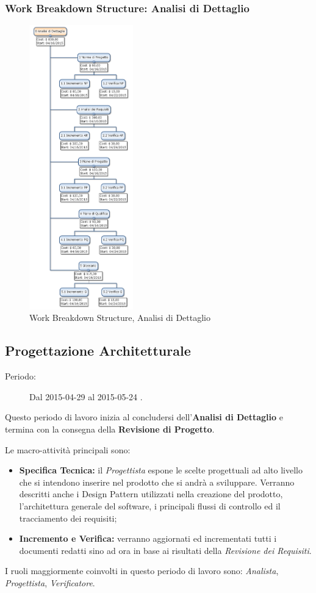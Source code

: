 \subsubsection{Work Breakdown Structure: Analisi di Dettaglio}
\begin{figure}[h]
	\centering
	\includegraphics[width=0.4\textwidth]{./img/wbs_analisi_dettaglio.png}
	\caption{Work Breakdown Structure, Analisi di Dettaglio}
\end{figure}

\newpage
\subsection{Progettazione Architetturale}
\begin{description}
	\item[Periodo:] Dal 2015-04-29 al 2015-05-24 .
\end{description}
Questo periodo di lavoro inizia al concludersi dell'\textbf{Analisi di Dettaglio} e termina con la consegna della \textbf{Revisione di Progetto}. 

\noindent Le macro-attività principali sono:
\begin{itemize}
	\item \textbf{Specifica Tecnica:} il \textit{Progettista} espone le scelte progettuali ad alto livello che si intendono inserire nel prodotto che si andrà a sviluppare.	Verranno descritti anche i \gls{Design Pattern} utilizzati nella creazione del prodotto, l'architettura generale del software, i principali flussi di controllo ed il tracciamento dei requisiti;
	\item \textbf{Incremento e Verifica:} verranno aggiornati ed incrementati tutti i documenti redatti sino ad ora in base ai risultati della \textit{Revisione dei Requisiti}.	
\end{itemize}
I ruoli maggiormente coinvolti in questo periodo di lavoro sono: \textit{Analista}, \textit{Progettista}, \textit{Verificatore}. 
